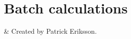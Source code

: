 \chapter{Batch calculations}
 \label{sec:batch}


%
%
 & Created by Patrick Eriksson.\\
\stophistory

 



